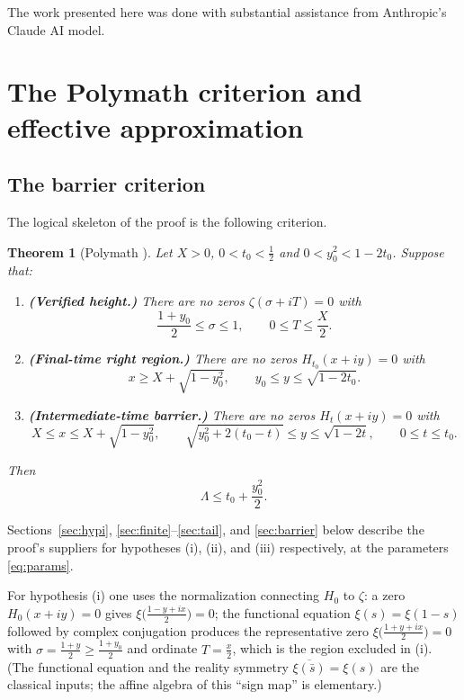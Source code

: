 \documentclass[11pt]{article}
\newtheorem{theorem}{Theorem}[section]
\theoremstyle{definition}
\newcommand{\LB}{\Lambda}
\begin{document}
The work presented here was done with substantial assistance from Anthropic's Claude AI model.

\section{The Polymath criterion and effective approximation}

\subsection{The barrier criterion}

The logical skeleton of the proof is the following criterion.

\begin{theorem}[{Polymath \cite[Theorem~1.2]{Polymath}}]\label{thm:criterion}
Let $X>0$, $0<t_0<\tfrac12$ and $0<y_0^2<1-2t_0$. Suppose that:
\begin{enumerate}
\item[\textup{(i)}] \textbf{(Verified height.)} There are no zeros
$\zeta(\sigma+iT)=0$ with
\[
\frac{1+y_0}{2}\le\sigma\le1,\qquad 0\le T\le\frac X2 .
\]
\item[\textup{(ii)}] \textbf{(Final-time right region.)} There are no
zeros $H_{t_0}(x+iy)=0$ with
\[
x\ge X+\sqrt{1-y_0^2},\qquad y_0\le y\le\sqrt{1-2t_0}.
\]
\item[\textup{(iii)}] \textbf{(Intermediate-time barrier.)} There are
no zeros $H_t(x+iy)=0$ with
\[
X\le x\le X+\sqrt{1-y_0^2},\qquad
\sqrt{y_0^2+2(t_0-t)}\le y\le\sqrt{1-2t},\qquad
0\le t\le t_0 .
\]
\end{enumerate}
Then
\[
\LB\le t_0+\frac{y_0^2}{2}.
\]
\end{theorem}

Sections~\ref{sec:hypi}, \ref{sec:finite}--\ref{sec:tail}, and
\ref{sec:barrier} below describe the proof's suppliers for
hypotheses (i), (ii), and (iii) respectively, at the parameters
\eqref{eq:params}.

For hypothesis (i) one uses the normalization connecting $H_0$ to
$\zeta$: a zero $H_0(x+iy)=0$ gives
$\xi\bigl(\frac{1-y+ix}{2}\bigr)=0$; the functional equation
$\xi(s)=\xi(1-s)$ followed by complex conjugation produces the
representative zero $\xi\bigl(\frac{1+y+ix}{2}\bigr)=0$ with
$\sigma=\frac{1+y}2\ge\frac{1+y_0}2$ and ordinate $T=\frac x2$, which
is the region excluded in (i). (The functional equation and the
reality symmetry $\overline{\xi(\bar s)}=\xi(s)$ are the classical
inputs; the affine algebra of this ``sign map'' is elementary.)
\end{document}
